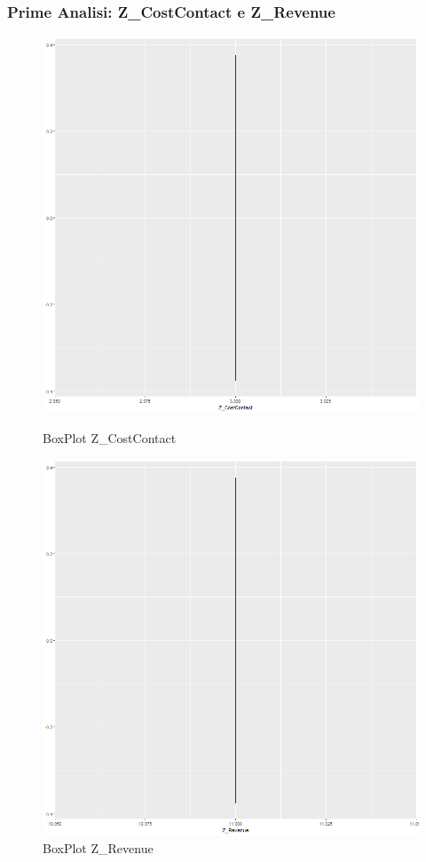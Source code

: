 \begin{frame}[fragile]
\frametitle{Prime Analisi: Z\_CostContact e Z\_Revenue}
\begin{figure}[H]
  \centering
  \begin{minipage}[b]{0.35\textwidth}
    \includegraphics[width=\textwidth]{Img/DESCRIPTION018.png}
    \caption{BoxPlot Z\_CostContact}
    \label{fig:ZRevenue}
  \end{minipage}
  \hspace{5em}
  \begin{minipage}[b]{0.35\textwidth}
    \includegraphics[width=\textwidth]{Img/DESCRIPTION019.png}
    \caption{BoxPlot Z\_Revenue}
      \label{fig:ZCostContact}
  \end{minipage}
\end{figure}
\end{frame}
